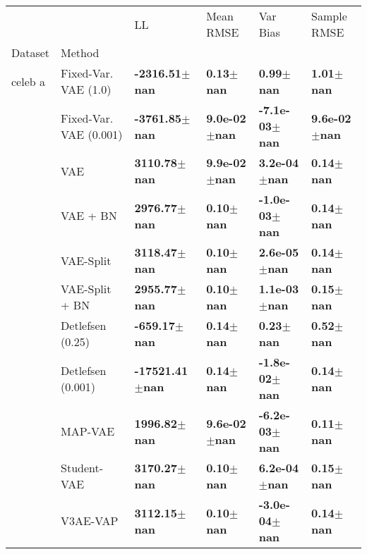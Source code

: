 \begin{tabular}{llllll}
\toprule
             &            &                           LL &                     Mean RMSE &                      Var Bias &                   Sample RMSE \\
Dataset & Method &                              &                               &                               &                               \\
\midrule
celeb a & Fixed-Var. VAE (1.0) &    \textbf{-2316.51$\pm$nan} &         \textbf{0.13$\pm$nan} &         \textbf{0.99$\pm$nan} &         \textbf{1.01$\pm$nan} \\
             & Fixed-Var. VAE (0.001) &    \textbf{-3761.85$\pm$nan} &      \textbf{9.0e-02$\pm$nan} &     \textbf{-7.1e-03$\pm$nan} &      \textbf{9.6e-02$\pm$nan} \\
             & VAE &     \textbf{3110.78$\pm$nan} &      \textbf{9.9e-02$\pm$nan} &      \textbf{3.2e-04$\pm$nan} &         \textbf{0.14$\pm$nan} \\
             & VAE + BN &     \textbf{2976.77$\pm$nan} &         \textbf{0.10$\pm$nan} &     \textbf{-1.0e-03$\pm$nan} &         \textbf{0.14$\pm$nan} \\
             & VAE-Split &     \textbf{3118.47$\pm$nan} &         \textbf{0.10$\pm$nan} &      \textbf{2.6e-05$\pm$nan} &         \textbf{0.14$\pm$nan} \\
             & VAE-Split + BN &     \textbf{2955.77$\pm$nan} &         \textbf{0.10$\pm$nan} &      \textbf{1.1e-03$\pm$nan} &         \textbf{0.15$\pm$nan} \\
             & Detlefsen (0.25) &     \textbf{-659.17$\pm$nan} &         \textbf{0.14$\pm$nan} &         \textbf{0.23$\pm$nan} &         \textbf{0.52$\pm$nan} \\
             & Detlefsen (0.001) &   \textbf{-17521.41$\pm$nan} &         \textbf{0.14$\pm$nan} &     \textbf{-1.8e-02$\pm$nan} &         \textbf{0.14$\pm$nan} \\
             & MAP-VAE &     \textbf{1996.82$\pm$nan} &      \textbf{9.6e-02$\pm$nan} &     \textbf{-6.2e-03$\pm$nan} &         \textbf{0.11$\pm$nan} \\
             & Student-VAE &     \textbf{3170.27$\pm$nan} &         \textbf{0.10$\pm$nan} &      \textbf{6.2e-04$\pm$nan} &         \textbf{0.15$\pm$nan} \\
             & V3AE-VAP &     \textbf{3112.15$\pm$nan} &         \textbf{0.10$\pm$nan} &     \textbf{-3.0e-04$\pm$nan} &         \textbf{0.14$\pm$nan} \\

\end{tabular}
